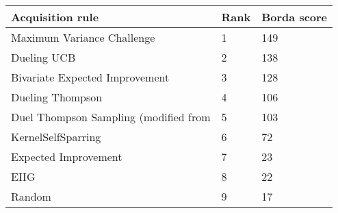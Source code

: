 \begin{tabular}{lll}
Acquisition rule & Rank & Borda score \\ 
\hline 
Maximum Variance Challenge                                 & 1 & 149 \\ 
Dueling UCB \citep{Benavoli2020}                           & 2 & 138 \\ 
Bivariate Expected Improvement \citep{Nielsen2015}         & 3 & 128 \\ 
Dueling Thompson \citep{Benavoli2020}                      & 4 & 106 \\ 
Duel Thompson Sampling (modified from \citet{Gonzalez2017} & 5 & 103 \\ 
KernelSelfSparring \citep{Sui2017}                         & 6 & 72 \\ 
Expected Improvement \citep{Brochu2010a}                   & 7 & 23 \\ 
EIIG \citep{Benavoli2020}                                  & 8 & 22 \\ 
Random                                                     & 9 & 17 \\ 
\hline 
\end{tabular}